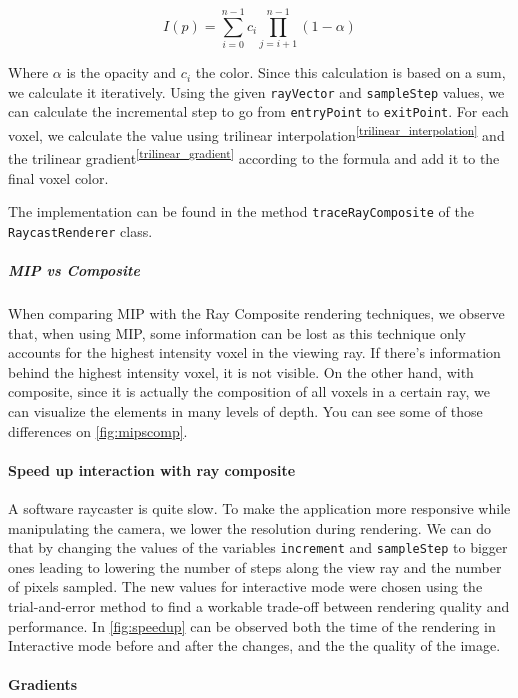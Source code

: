 \documentclass[a4paper]{article}
\begin{document}
$$I(p)=\sum^{n-1}_{i=0}c_i\prod^{n-1}_{j=i+1}(1-\alpha)$$

Where $\alpha$ is the opacity and $c_i$ the color. Since this calculation is based on a sum, we calculate it iteratively. Using the given {\tt rayVector} and {\tt sampleStep} values, we can calculate the incremental step to go from {\tt entryPoint} to {\tt exitPoint}. For each voxel, we calculate the value using trilinear interpolation\textsuperscript{\autoref{trilinear_interpolation}} and the trilinear gradient\textsuperscript{\autoref{trilinear_gradient}} according to the formula and add it to the final voxel color.

The implementation can be found in the method {\tt traceRayComposite} of the {\tt RaycastRenderer} class.

\subparagraph{MIP vs Composite}

When comparing MIP with the Ray Composite rendering techniques, we observe that, when using MIP, some information can be lost as this technique only accounts for the highest intensity voxel in the viewing ray. If there's information behind the highest intensity voxel, it is not visible. On the other hand, with composite, since it is actually the composition of all voxels in a certain ray, we can visualize the elements in many levels of depth. You can see some of those differences on \autoref{fig:mipscomp}.

\paragraph{Speed up interaction with ray composite}
\label{speed_up}

A software raycaster is quite slow. To make the application more responsive while manipulating the camera, we lower the resolution during rendering. We can do that by changing the values of the variables {\tt increment} and {\tt sampleStep} to bigger ones leading to lowering the number of steps along the view ray and the number of pixels sampled.  The new values for interactive mode were chosen using the trial-and-error method to find a workable trade-off between rendering quality and performance. In \autoref{fig:speedup} can be observed both the time of the rendering in Interactive mode before and after the changes, and the the quality of the image.

\paragraph{Gradients}
\label{subsec:gradients}
\end{document}
